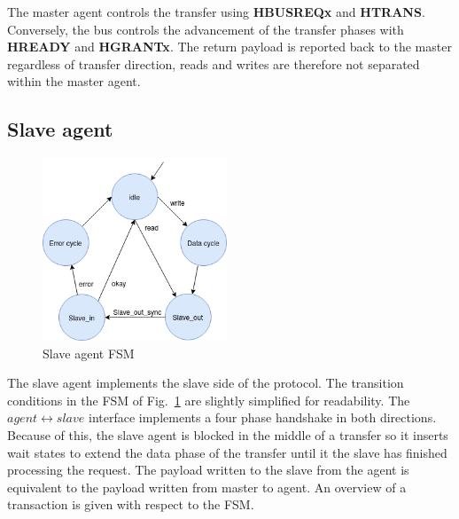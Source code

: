The master agent controls the transfer using \textbf{HBUSREQx} and \textbf{HTRANS}. Conversely, the bus controls the advancement of the transfer phases with \textbf{HREADY} and \textbf{HGRANTx}. The return payload is reported back to the master regardless of transfer direction, reads and writes are therefore not separated within the master agent.  


\newpage
\subsection{Slave agent}
\label{sub:sagent}
\begin{figure}
\includegraphics[width=5.5cm]{figs/hw/sAgent_FSM.png}
\caption{Slave agent FSM}\label{fig:rsfsm}
\end{figure}  

The slave agent implements the slave side of the protocol. The transition conditions in the FSM of Fig.~\ref{fig:rsfsm} are slightly simplified for readability. 
The $agent\leftrightarrow slave$ interface implements a four phase handshake in both directions. Because of this, the slave agent is blocked in the middle of a transfer so it inserts wait states to extend the data phase of the transfer until it the slave has finished processing the request. The payload written to the slave from the agent is equivalent to the payload written from master to agent. An overview of a transaction is given with respect to the FSM.\par
 \vspace{1cm} 

